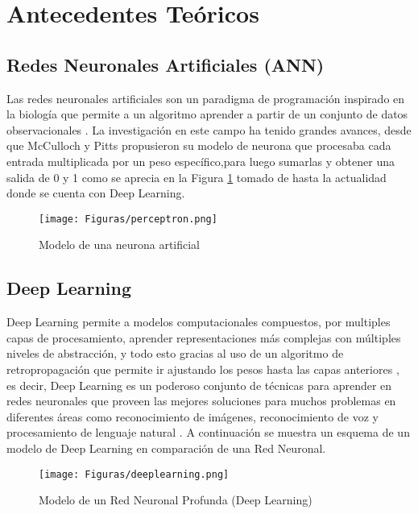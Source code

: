 \documentclass[conference]{IEEEtran}
\begin{document}
\section{Antecedentes Teóricos}

\subsection{Redes Neuronales Artificiales (ANN)}
Las redes neuronales artificiales son un paradigma de programación inspirado en la biología que permite a un algoritmo aprender a partir de un conjunto de datos observacionales \cite{nielsen2018neural}. La investigación en este campo ha tenido grandes avances, desde que McCulloch y Pitts propusieron su modelo de neurona que procesaba cada entrada multiplicada por un peso específico,para luego sumarlas y obtener una salida de 0 y 1 \cite{mcculloch1943logical} como se aprecia en la Figura \ref{fig:perceptron} tomado de \cite{rojas2013neural}  hasta la actualidad donde se cuenta con Deep Learning.

\begin{figure}[hbtp]
\centering
\texttt{[image: Figuras/perceptron.png]}
\caption{Modelo de una neurona artificial}
\label{fig:perceptron}
\end{figure}

\subsection{Deep Learning}

Deep Learning permite a modelos computacionales compuestos, por multiples capas de procesamiento, aprender representaciones más complejas con múltiples niveles de abstracción, y todo esto gracias al uso de un algoritmo de retropropagación que permite ir ajustando los pesos hasta las capas anteriores \cite{lecun2015deep}, es decir, Deep Learning es un poderoso conjunto de técnicas para aprender en redes neuronales que proveen las mejores soluciones para muchos problemas en diferentes áreas como reconocimiento de imágenes, reconocimiento de voz y procesamiento de lenguaje natural \cite{nielsen2018neural}. A continuación se muestra un esquema de un modelo de Deep Learning en comparación de una Red Neuronal.

\begin{figure}[hbtp]
\centering
\texttt{[image: Figuras/deeplearning.png]}
\caption{Modelo de un Red Neuronal Profunda (Deep Learning)}
\label{fig:deeplearning}
\end{figure}
\end{document}
